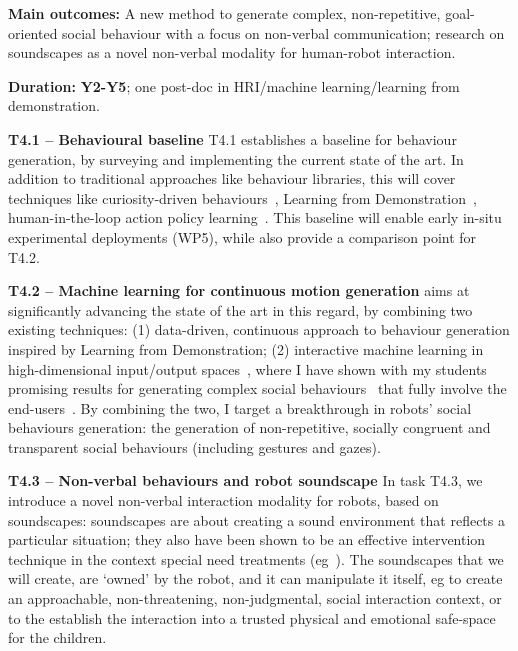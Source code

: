 
\begin{framed}

    \textbf{Main outcomes:} A new method to generate complex, non-repetitive,
    goal-oriented social behaviour with a focus on non-verbal communication;
    research on soundscapes as a novel non-verbal modality for human-robot
    interaction.

    \textbf{Duration:} \textbf{Y2-Y5}; one post-doc in HRI/machine learning/learning from
demonstration.

\end{framed}


\textbf{T4.1 -- Behavioural baseline} T4.1 establishes a baseline for behaviour
generation, by surveying and implementing the current state of the art. In
addition to traditional approaches like behaviour libraries, this will cover
techniques like curiosity-driven behaviours~\cite{oudeyer2005playground},
Learning from Demonstration~\cite{billard2008robot, argall2009survey},
human-in-the-loop action policy learning~\cite{senft2016sparc,
senft2019teaching}. This baseline will enable early in-situ experimental
deployments (WP5), while also provide a comparison point for T4.2.

\textbf{T4.2 -- Machine learning for continuous motion generation} \project aims
at significantly advancing the state of the art in this regard, by combining two
existing techniques: (1) data-driven, continuous approach to behaviour
generation inspired by Learning from Demonstration; (2) interactive machine
learning in high-dimensional input/output spaces~\cite{senft2020woz}, where I
have shown with my students promising results for generating complex social
behaviours~\cite{senft2019teaching, winkle2020couch} that fully involve the
end-users~\cite{winkle2018social}.  By combining the two, I target
a breakthrough in robots' social behaviours generation: the generation of
non-repetitive, socially congruent and transparent social behaviours (including
gestures and gazes).

\textbf{T4.3 -- Non-verbal behaviours and robot soundscape} In task T4.3, we
introduce a novel non-verbal interaction modality for robots, based on
soundscapes: soundscapes are about creating a sound environment that reflects a
particular situation; they also have been shown to be an effective intervention
technique in the context special need treatments
(eg~\cite{greher2010soundscape}). The soundscapes that we will create, are
`owned' by the robot, and it can manipulate it itself, eg to create an
approachable, non-threatening, non-judgmental, social interaction context, or to
the establish the interaction into a trusted physical and emotional safe-space
for the children.

